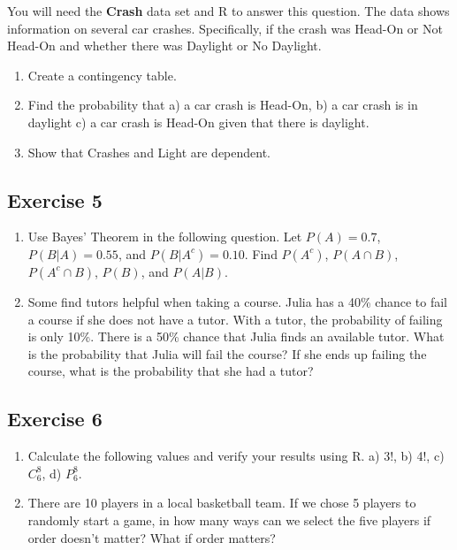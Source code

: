 \documentclass[
  letterpaper,
  DIV=11,
  numbers=noendperiod]{scrreprt}
\begin{document}
You will need the \textbf{Crash} data set and R to answer this question.
The data shows information on several car crashes. Specifically, if the
crash was Head-On or Not Head-On and whether there was Daylight or No
Daylight.

\begin{enumerate}
\def\labelenumi{\arabic{enumi}.}
\item
  Create a contingency table.
\item
  Find the probability that a) a car crash is Head-On, b) a car crash is
  in daylight c) a car crash is Head-On given that there is daylight.
\item
  Show that Crashes and Light are dependent.
\end{enumerate}

\hypertarget{exercise-5}{%
\subsection*{Exercise 5}\label{exercise-5}}

\begin{enumerate}
\def\labelenumi{\arabic{enumi}.}
\item
  Use Bayes' Theorem in the following question. Let \(P(A)=0.7\),
  \(P(B|A)=0.55\), and \(P(B|A^c)=0.10\). Find \(P(A^c)\),
  \(P(A \cap B)\), \(P(A^c \cap B)\), \(P(B)\), and \(P(A|B)\).
\item
  Some find tutors helpful when taking a course. Julia has a 40\% chance
  to fail a course if she does not have a tutor. With a tutor, the
  probability of failing is only 10\%. There is a 50\% chance that Julia
  finds an available tutor. What is the probability that Julia will fail
  the course? If she ends up failing the course, what is the probability
  that she had a tutor?
\end{enumerate}

\hypertarget{exercise-6}{%
\subsection*{Exercise 6}\label{exercise-6}}

\begin{enumerate}
\def\labelenumi{\arabic{enumi}.}
\item
  Calculate the following values and verify your results using R. a) 3!,
  b) 4!, c) \(C_6^8\), d) \(P_6^8\).
\item
  There are 10 players in a local basketball team. If we chose 5 players
  to randomly start a game, in how many ways can we select the five
  players if order doesn't matter? What if order matters?
\end{enumerate}
\end{document}
